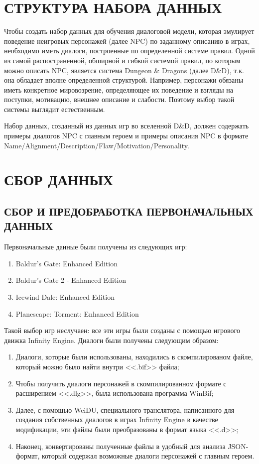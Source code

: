\section{СТРУКТУРА НАБОРА ДАННЫХ}
Чтобы создать набор данных для обучения диалоговой модели, которая эмулирует поведение  неигровых персонажей (далее NPC) по заданному описанию в играх, необходимо иметь диалоги, построенные по определенной системе правил. Одной из самой распостраненной, обширной и гибкой системой правил, по которым можно описать NPC, является система Dungeon \& Dragons (далее D\&D), т.к. она обладает вполне определенной структурой. Например, персонажи обязаны иметь конкретное мировозрение, определяющее их поведение и взгляды на поступки, мотивацию, внешнее описание и слабости. Поэтому выбор такой системы выглядит естественным. 

Набор данных, созданный из данных игр во вселенной D\&D, должен содержать примеры диалогов NPC с главным героем и примеры описания NPC в формате Name/Alignment/Description/Flaw/Motivation/Personality.

\section{СБОР ДАННЫХ}
\subsection{СБОР И ПРЕДОБРАБОТКА ПЕРВОНАЧАЛЬНЫХ ДАННЫХ}
Первоначальные данные были получены из следующих игр: 
\begin{enumerate}
    \item Baldur's Gate: Enhanced Edition
    \item Baldur's Gate 2 - Enhanced Edition
    \item Icewind Dale: Enhanced Edition
    \item Planescape: Torment: Enhanced Edition
\end{enumerate}

Такой выбор игр неслучаен: все эти игры были созданы с помощью 
игрового движка Infinity Engine. Диалоги были получены следующим образом:
\begin{enumerate}
    \item Диалоги, которые были использованы, находились в скомпилированом файле, который можно было найти внутри <<.bif>> файла;
    \item Чтобы получить диалоги персонажей в скомпилированном формате с расширением <<.dlg>>,
          была использована программа WinBif;
    \item Далее, с помощью WeiDU, специального транслятора,
          написанного для создания собственных диалогов в играх Infinity Engine в качестве модификации, 
          эти файлы были преобразованы в формат языка <<.d>>; 
    \item Наконец, конвертированы полученные файлы в удобный для анализа JSON-формат,
          который содержал возможные диалоги персонажей с главным героем.
\end{enumerate}

